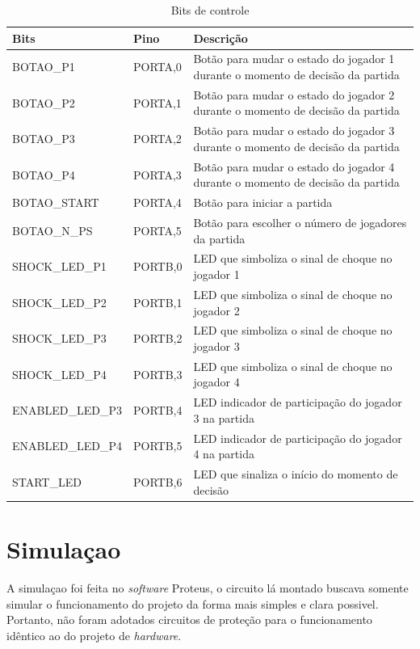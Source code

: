 \documentclass[article]{IEEEtran}
\begin{document}
\begin{table}
  \centering
  \caption{Bits de controle}
  \vspace{0.5cm}
  \label{tab:bits}
  \begin{tabular}{|p{2.3cm}|p{1cm}|p{4cm}|}\hline
    Bits 		& Pino		& Descrição						\\ \hline
    BOTAO\_P1		& PORTA,0	& Botão para mudar o estado do jogador 1 durante
					  o momento de decisão da partida			\\ \hline
    BOTAO\_P2		& PORTA,1	& Botão para mudar o estado do jogador 2 durante
					  o momento de decisão da partida			\\ \hline
    BOTAO\_P3		& PORTA,2	& Botão para mudar o estado
				   	do jogador 3 durante
					o momento de decisão da partida			\\ \hline
    BOTAO\_P4		& PORTA,3	& Botão para mudar o estado do jogador 4 durante o momento de decisão da partida			\\ \hline
    BOTAO\_START	& PORTA,4	& Botão para iniciar a partida				\\ \hline
    BOTAO\_N\_PS	& PORTA,5	& Botão para escolher o número de jogadores da partida	\\ \hline
    SHOCK\_LED\_P1	& PORTB,0	& LED que simboliza o sinal de choque no jogador 1	\\ \hline
    SHOCK\_LED\_P2	& PORTB,1	& LED que simboliza o sinal de choque no jogador 2	\\ \hline
    SHOCK\_LED\_P3	& PORTB,2	& LED que simboliza o sinal de choque no jogador 3	\\ \hline
    SHOCK\_LED\_P4	& PORTB,3	& LED que simboliza o sinal de choque no jogador 4	\\ \hline
    ENABLED\_LED\_P3	& PORTB,4	& LED indicador de participação do jogador 3 na partida	\\ \hline
    ENABLED\_LED\_P4	& PORTB,5	& LED indicador de participação do jogador 4 na partida	\\ \hline
    START\_LED		& PORTB,6	& LED que sinaliza o início do momento de decisão	\\ \hline
  \end{tabular}
\end{table}

\section{Simulaçao}
A simulaçao foi feita no \textit{software} Proteus, o circuito lá montado buscava somente simular o funcionamento do projeto da forma mais simples e clara possivel. Portanto, não foram adotados circuitos de proteção para o funcionamento idêntico ao do projeto de \textit{hardware}. 
\end{document}
